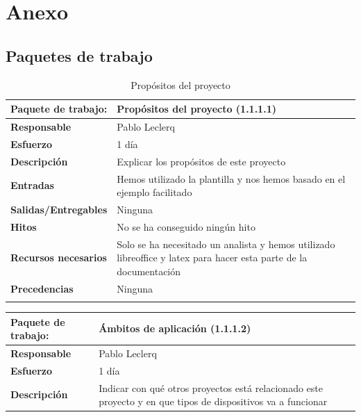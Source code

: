 \documentclass{report}
\begin{document}
    \chapter*{Anexo}
        \section*{Paquetes de trabajo}
            \begin{center}
                \begin{longtable}{|p{6cm}|p{6cm}|}
                    \hline
                    \textbf{Paquete de trabajo:} & Propósitos del proyecto (1.1.1.1)\\
                    \hline
                    \textbf{Responsable} & Pablo Leclerq\\
                    \hline
                    \textbf{Esfuerzo} & 1 día\\
                    \hline
                    \textbf{Descripción} & Explicar los propósitos de este proyecto\\
                    \hline
                    \textbf{Entradas} & Hemos utilizado la plantilla y nos hemos basado en el ejemplo facilitado\\
                    \hline
                    \textbf{Salidas/Entregables} & Ninguna\\
                    \hline
                    \textbf{Hitos} & No se ha conseguido ningún hito\\
                    \hline
                    \textbf{Recursos necesarios} & Solo se ha necesitado un analista y hemos utilizado libreoffice y latex para hacer esta parte de la documentación\\
                    \hline
                    \textbf{Precedencias} & Ninguna\\
                    \hline
                    \caption{Propósitos del proyecto}
                \end{longtable}
                \begin{longtable}{|p{6cm}|p{6cm}|}
                    \hline
                    \textbf{Paquete de trabajo:} & Ámbitos de aplicación (1.1.1.2)\\
                    \hline
                    \textbf{Responsable} & Pablo Leclerq\\
                    \hline
                    \textbf{Esfuerzo} & 1 día\\
                    \hline
                    \textbf{Descripción} & Indicar con qué otros proyectos está relacionado este proyecto y en que tipos de dispositivos va a funcionar\\

\end{longtable}
\end{center}
\end{document}
